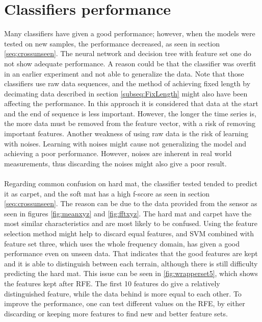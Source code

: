 \documentclass[USenglish]{ifimaster}  %
\begin{document}
\section{Classifiers performance}
Many classifiers have given a good performance; however, when the models were tested on new samples, the performance decreased, as seen in section \ref{seq:crossunseen}. The neural network and decision tree with feature set one do not show adequate performance. A reason could be that the classifier was overfit in an earlier experiment and not able to generalize the data. Note that those classifiers use raw data sequences, and the method of achieving fixed length by decimating data described in section \ref{subseq:FixLength} might also have been affecting the performance. In this approach it is considered that data at the start and the end of sequence is less important. However, the longer the time series is, the more data must be removed from the feature vector, with a risk of removing important features. Another weakness of using raw data is the risk of learning with noises. Learning with noises might cause not generalizing the model and achieving a poor performance. However, noises are inherent in real world measurements, thus discarding the noises might also give a poor result.
\\
\\
Regarding common confusion on hard mat, the classifier tested tended to predict it as carpet, and the soft mat has a high f-score as seen in section \ref{seq:crossunseen}. The reason can be due to the data provided from the sensor as seen in figures \ref{fig:meanxyz} and \ref{fig:fftxyz}. The hard mat and carpet have the most similar characteristics and are most likely to be confused. Using the feature selection method might help to discard equal features, and SVM combined with feature set three, which uses the whole frequency domain, has given a good performance even on unseen data. That indicates that the good features are kept and it is able to distinguish between each terrain, although there is still difficulty predicting the hard mat. This issue can be seen in \ref{fig:wrapperset5}, which shows the features kept after RFE. The first 10 features do give a relatively distinguished feature, while the data behind is more equal to each other. To improve the performance, one can test different values on the RFE, by either discarding or keeping more features to find new and better feature sets. 
	
\end{document}
